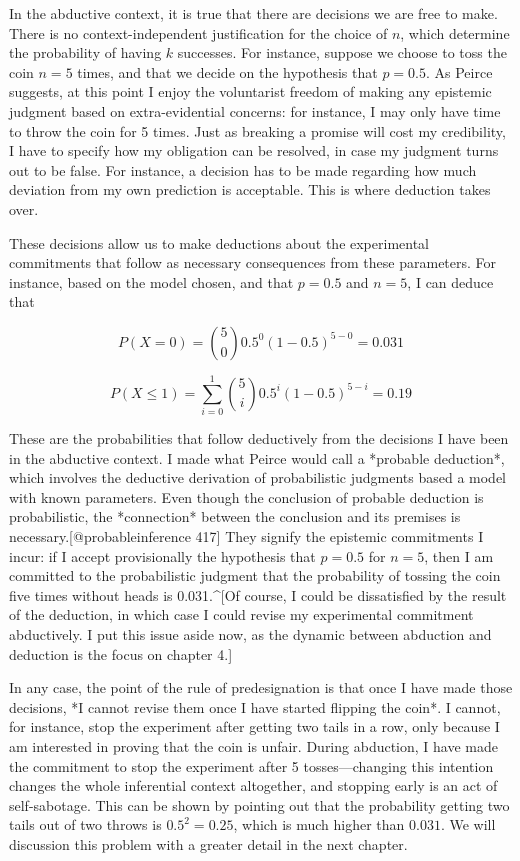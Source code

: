In the abductive context, it is true that there are decisions we are
free to make. There is no context-independent justification for the
choice of \(n\), which determine the probability of having \(k\)
successes. For instance, suppose we choose to toss the coin \(n=5\)
times, and that we decide on the hypothesis that \(p=0.5\). As Peirce
suggests, at this point I enjoy the voluntarist freedom of making any
epistemic judgment based on extra-evidential concerns: for instance, I
may only have time to throw the coin for 5 times. Just as breaking a
promise will cost my credibility, I have to specify how my obligation
can be resolved, in case my judgment turns out to be false. For
instance, a decision has to be made regarding how much deviation from my
own prediction is acceptable. This is where deduction takes over.

These decisions allow us to make deductions about the experimental
commitments that follow as necessary consequences from these parameters.
For instance, based on the model chosen, and that \(p=0.5\) and \(n=5\),
I can deduce that

\[P(X=0) = {5 \choose 0} 0.5^0 (1-0.5)^{5-0} = 0.031\]

\[P(X\leq 1) = \sum_{i=0}^1 {5 \choose i } 0.5^i (1-0.5)^{5-i} = 0.19\]

These are the probabilities that follow deductively from the decisions I
have been in the abductive context. I made what Peirce would call a
*probable deduction*, which involves the deductive derivation of
probabilistic judgments based a model with known parameters. Even though
the conclusion of probable deduction is probabilistic, the *connection*
between the conclusion and its premises is
necessary.{[}@probableinference 417{]} They signify the epistemic
commitments I incur: if I accept provisionally the hypothesis that
\(p=0.5\) for \(n=5\), then I am committed to the probabilistic judgment
that the probability of tossing the coin five times without heads is
0.031.\^{}{[}Of course, I could be dissatisfied by the result of the
deduction, in which case I could revise my experimental commitment
abductively. I put this issue aside now, as the dynamic between
abduction and deduction is the focus on chapter 4.{]}

In any case, the point of the rule of predesignation is that once I have
made those decisions, *I cannot revise them once I have started flipping
the coin*. I cannot, for instance, stop the experiment after getting two
tails in a row, only because I am interested in proving that the coin is
unfair. During abduction, I have made the commitment to stop the
experiment after 5 tosses---changing this intention changes the whole
inferential context altogether, and stopping early is an act of
self-sabotage. This can be shown by pointing out that the probability
getting two tails out of two throws is \(0.5^2 = 0.25\), which is much
higher than \(0.031\). We will discussion this problem with a greater
detail in the next chapter.

